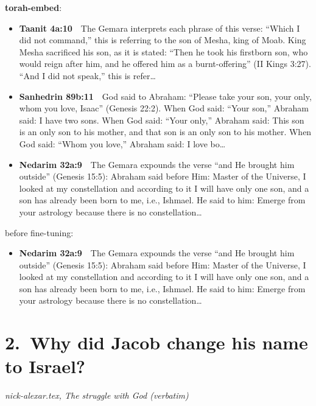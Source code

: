 \documentclass[11pt,a4paper]{article}
\begin{document}
{\color{quiet}\small\textbf{torah-embed}:}
\begin{itemize}[leftmargin=1.2em,itemsep=3pt]
\item {\color{ref}\textbf{Taanit 4a:10}}\ \ The Gemara interprets each phrase of this verse: “Which I did not command,” this is referring to the son of Mesha, king of Moab. King Mesha sacrificed his son, as it is stated: “Then he took his firstborn son, who would reign after him, and he offered him as a burnt-offering” (II Kings 3:27). “And I did not speak,” this is refer\ldots
\item {\color{ref}\textbf{Sanhedrin 89b:11}}\ \ God said to Abraham: “Please take your son, your only, whom you love, Isaac” (Genesis 22:2). When God said: “Your son,” Abraham said: I have two sons. When God said: “Your only,” Abraham said: This son is an only son to his mother, and that son is an only son to his mother. When God said: “Whom you love,” Abraham said: I love bo\ldots
\item {\color{ref}\textbf{Nedarim 32a:9}}\ \ The Gemara expounds the verse “and He brought him outside” (Genesis 15:5): Abraham said before Him: Master of the Universe, I looked at my constellation and according to it I will have only one son, and a son has already been born to me, i.e., Ishmael. He said to him: Emerge from your astrology because there is no constellation\ldots
\end{itemize}
{\color{quiet}\small before fine-tuning:}
\begin{itemize}[leftmargin=1.2em]
\item {\color{ref}\textbf{Nedarim 32a:9}}\ \ The Gemara expounds the verse “and He brought him outside” (Genesis 15:5): Abraham said before Him: Master of the Universe, I looked at my constellation and according to it I will have only one son, and a son has already been born to me, i.e., Ishmael. He said to him: Emerge from your astrology because there is no constellation\ldots
\end{itemize}

\section*{2.\ Why did Jacob change his name to Israel?}
{\color{quiet}\small\textit{nick-alexar.tex, The struggle with God (verbatim)}}
\end{document}
